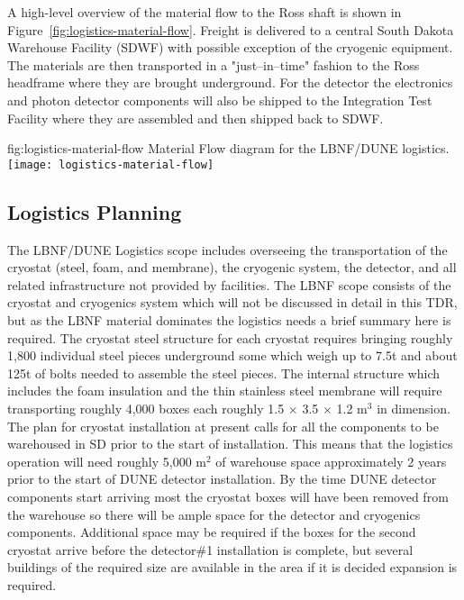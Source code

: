  A high-level overview of the material flow to the Ross shaft is shown in Figure~\ref{fig:logistics-material-flow}. Freight is delivered to a central South Dakota Warehouse Facility (SDWF) with possible exception of the cryogenic equipment. 
 The materials are then transported in a "just--in--time" fashion to the Ross headframe where they are brought underground. For the detector the  electronics and photon detector components will also be shipped to the Integration Test Facility where they are assembled and then shipped back to SDWF.
 
\begin{dunefigure}{fig:logistics-material-flow}
  {Material Flow diagram for the LBNF/DUNE logistics.}
 \texttt{[image: logistics-material-flow]}
\end{dunefigure}


\subsection{Logistics Planning}
\label{sec:fdsp-tc-logPln}
The LBNF/DUNE Logistics scope includes overseeing the transportation of the cryostat (steel, foam, and membrane), the cryogenic system, the detector, and all related infrastructure not provided by facilities. The LBNF scope consists of the cryostat and cryogenics system which will not be discussed in detail in this TDR, but as the LBNF material dominates the logistics needs a brief summary here is required. The cryostat steel structure for each cryostat requires bringing roughly 1,800 individual steel pieces underground some which weigh up to 7.5t and about 125t of bolts needed to assemble the steel pieces. The internal structure which includes the foam insulation and the thin stainless steel membrane will require transporting roughly 4,000 boxes each roughly 1.5 $\times$ 3.5 $\times$ 1.2 m$^3$ in dimension. The plan for cryostat installation at present calls for all the components to be warehoused in SD prior to the start of installation. This means that the logistics operation will need roughly 5,000 m$^2$ of warehouse space approximately 2 years prior to the start of DUNE detector installation. By the time DUNE detector components start arriving most the cryostat boxes will have been removed from the warehouse so there will be ample space for the detector and cryogenics components. Additional space may be required if the boxes for the second cryostat arrive before the detector\#1 installation is complete, but several buildings of the required size are available in the area if it is decided expansion is required.


